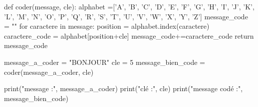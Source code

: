 \begin{python}
def coder(message, cle):
  alphabet =['A', 'B', 'C', 'D', 'E', 'F', 'G', 'H', 'I', 'J',
 'K', 'L', 'M', 'N', 'O', 'P', 'Q', 'R', 'S', 'T', 'U', 'V',
 'W', 'X', 'Y', 'Z']
  message_code = ""
  for caractere in message:
    position = alphabet.index(caractere)
    caractere_code = alphabet[position+cle]
    message_code+=caractere_code
  return message_code

message_a_coder = "BONJOUR"
cle = 5
message_bien_code = coder(message_a_coder, cle)

print("message :", message_a_coder)
print("clé :", cle)
print("message codé :", message_bien_code) 
\end{python}